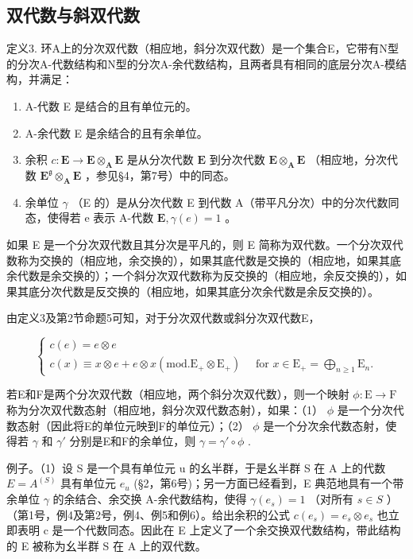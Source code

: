 \subsection{双代数与斜双代数}

定义3. 环A上的分次双代数（相应地，斜分次双代数）是一个集合E，它带有N型的分次A-代数结构和N型的分次A-余代数结构，且两者具有相同的底层分次A-模结构，并满足：

\begin{enumerate}
\def\labelenumi{(\arabic{enumi})}
\item
  A-代数 E 是结合的且有单位元的。
\item
  A-余代数 E 是余结合的且有余单位。
\item
  余积 \(c: \mathbf{E} \to \mathbf{E} \otimes_{\mathbf{A}} \mathbf{E}\) 是从分次代数 \(\mathbf{E}\) 到分次代数 \(\mathbf{E} \otimes_{\mathbf{A}} \mathbf{E}\) （相应地，分次代数 \(\mathbf{E}^{\mathfrak{g}} \otimes_{\mathbf{A}} \mathbf{E}\) ，参见§4，第7号）中的同态。
\item
  余单位 \(\gamma\) （E 的）是从分次代数 E 到代数 A（带平凡分次）中的分次代数同态，使得若 e 表示 A-代数 \(\mathbf{E}, \gamma(e) = 1\) 。
\end{enumerate}

如果 E 是一个分次双代数且其分次是平凡的，则 E 简称为双代数。一个分次双代数称为交换的（相应地，余交换的），如果其底代数是交换的（相应地，如果其底余代数是余交换的）；一个斜分次双代数称为反交换的（相应地，余反交换的），如果其底分次代数是反交换的（相应地，如果其底分次余代数是余反交换的）。

由定义3及第2节命题5可知，对于分次双代数或斜分次双代数E，

\[
\left\{ \begin{array}{c} c (e) = e \otimes e \\ c (x) \equiv x \otimes e + e \otimes x (\mathrm{mod.} \mathrm{E} _ {+} \otimes \mathrm{E} _ {+}) \quad \text { for } x \in \mathrm{E} _ {+} = \bigoplus_ {n \geqslant 1} \mathrm{E} _ {n}. \end{array} \right.\tag{22}
\]

若E和F是两个分次双代数（相应地，两个斜分次双代数），则一个映射 \(\phi: \mathrm{E} \to \mathrm{F}\) 称为分次双代数态射（相应地，斜分次双代数态射），如果：（1） \(\phi\) 是一个分次代数态射（因此将E的单位元映到F的单位元）；（2） \(\phi\) 是一个分次余代数态射，使得若 \(\gamma\) 和 \(\gamma'\) 分别是E和F的余单位，则 \(\gamma = \gamma' \circ \phi\) .

例子。（1）设 S 是一个具有单位元 u 的幺半群，于是幺半群 S 在 A 上的代数 \(E = A^{(S)}\) 具有单位元 \(e_{u}\) (§2，第6号)；另一方面已经看到，E 典范地具有一个带余单位 \(\gamma\) 的余结合、余交换 A-余代数结构，使得 \(\gamma(e_{s}) = 1\) （对所有 \(s \in S\) ）（第1号，例4及第2号，例4、例5和例6）。给出余积的公式 \(c(e_{s}) = e_{s} \otimes e_{s}\) 也立即表明 c 是一个代数同态。因此在 E 上定义了一个余交换双代数结构，带此结构的 E 被称为幺半群 S 在 A 上的双代数。


